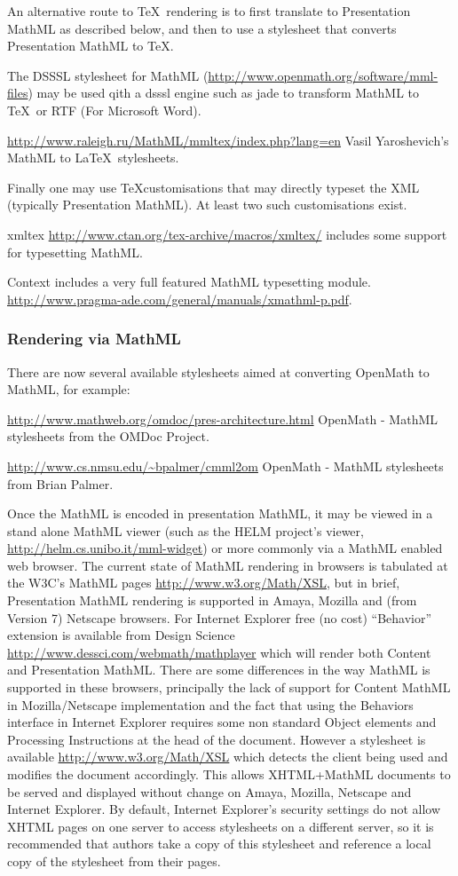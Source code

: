 \documentclass[keylogo]{openmath}
\begin{document}
An alternative route to \TeX\ rendering is to first translate to
Presentation MathML as described below, and then to use a stylesheet
that converts Presentation MathML to \TeX.

The DSSSL stylesheet for MathML (\url{http://www.openmath.org/software/mml-files})
may be used qith a dsssl engine such as jade to transform MathML to
\TeX\ or RTF (For Microsoft Word).

\url{http://www.raleigh.ru/MathML/mmltex/index.php?lang=en} Vasil
Yaroshevich's MathML to \LaTeX\ stylesheets.

Finally one may use \TeX customisations that may directly typeset the XML
(typically Presentation MathML). At least two such customisations
exist.

xmltex \url{http://www.ctan.org/tex-archive/macros/xmltex/} includes
some support for typesetting MathML.

Context includes a very full featured MathML typesetting module.
\url{http://www.pragma-ade.com/general/manuals/xmathml-p.pdf}.

\subsubsection{Rendering via MathML}

There are now several available stylesheets aimed at converting
OpenMath to MathML, for example:


\url{http://www.mathweb.org/omdoc/pres-architecture.html} OpenMath -
MathML stylesheets from the OMDoc Project.

\url{http://www.cs.nmsu.edu/~bpalmer/cmml2om} OpenMath - MathML
stylesheets from Brian Palmer.

Once the MathML is encoded in presentation MathML, it may be viewed in
a stand alone MathML viewer (such as the HELM project's viewer,
\url{http://helm.cs.unibo.it/mml-widget}) or more commonly via a MathML enabled web browser.  The
current state of MathML rendering in browsers is tabulated at the
W3C's MathML pages \url{http://www.w3.org/Math/XSL}, but in brief,
Presentation MathML rendering is supported in Amaya, Mozilla and (from
Version 7) Netscape browsers. For Internet Explorer free (no cost)
``Behavior'' extension is available from Design Science
\url{http://www.dessci.com/webmath/mathplayer} which will render both
Content and Presentation MathML. There are some differences in the way
MathML is supported in these browsers, principally the lack of support
for Content MathML in Mozilla/Netscape implementation and the fact
that using the Behaviors interface in Internet Explorer requires some
non standard Object elements and Processing Instructions at the head
of the document. However a stylesheet is available
\url{http://www.w3.org/Math/XSL} which detects the client being used
and modifies the document accordingly. This allows XHTML+MathML
documents to be served and displayed without change on Amaya, Mozilla,
Netscape and Internet Explorer. By default, Internet Explorer's
security settings do not allow XHTML pages on one server to access
stylesheets on a different server, so it is recommended that authors
take a copy of this stylesheet and reference a local copy of the
stylesheet from their pages.
\end{document}
